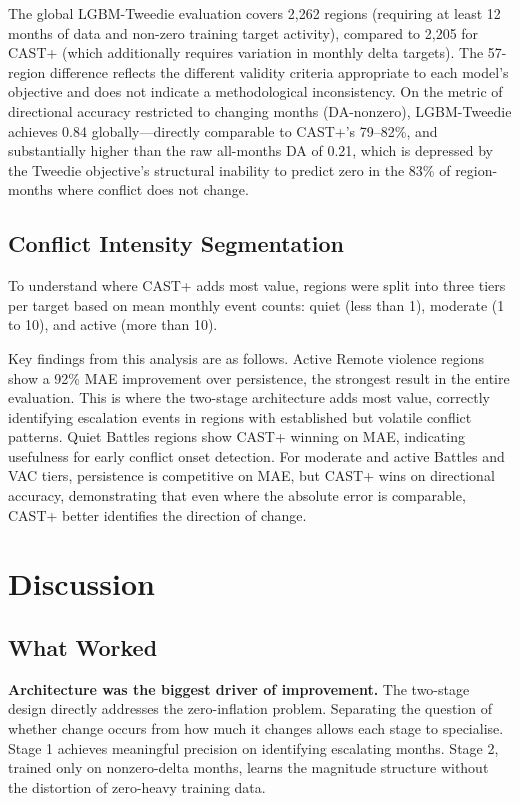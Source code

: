 \documentclass[12pt,a4paper]{article}
\begin{document}
The global LGBM-Tweedie evaluation covers 2,262 regions (requiring
at least 12 months of data and non-zero training target activity),
compared to 2,205 for CAST+ (which additionally requires variation
in monthly delta targets). The 57-region difference reflects the
different validity criteria appropriate to each model's objective
and does not indicate a methodological inconsistency. On the metric
of directional accuracy restricted to changing months (DA-nonzero),
LGBM-Tweedie achieves 0.84 globally---directly comparable to
CAST+'s 79--82\%, and substantially higher than the raw all-months
DA of 0.21, which is depressed by the Tweedie objective's structural
inability to predict zero in the 83\% of region-months where
conflict does not change.

\subsection{Conflict Intensity Segmentation}

To understand where CAST+ adds most value, regions were split into three
tiers per target based on mean monthly event counts: quiet (less than 1),
moderate (1 to 10), and active (more than 10).

Key findings from this analysis are as follows. Active Remote violence
regions show a 92\% MAE improvement over persistence, the strongest
result in the entire evaluation. This is where the two-stage architecture
adds most value, correctly identifying escalation events in regions with
established but volatile conflict patterns. Quiet Battles regions show
CAST+ winning on MAE, indicating usefulness for early conflict onset
detection. For moderate and active Battles and VAC tiers, persistence
is competitive on MAE, but CAST+ wins on directional accuracy,
demonstrating that even where the absolute error is comparable, CAST+
better identifies the direction of change.


\section{Discussion}

\subsection{What Worked}

\textbf{Architecture was the biggest driver of improvement.} The
two-stage design directly addresses the zero-inflation problem. Separating
the question of whether change occurs from how much it changes allows
each stage to specialise. Stage 1 achieves meaningful precision on
identifying escalating months. Stage 2, trained only on nonzero-delta
months, learns the magnitude structure without the distortion of
zero-heavy training data.
\end{document}
